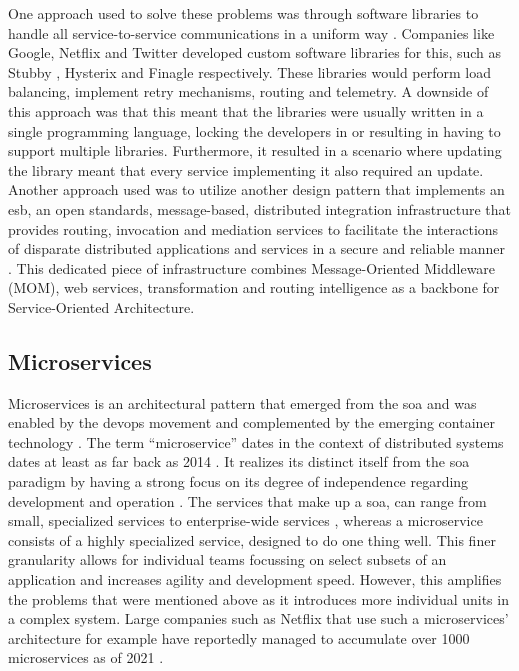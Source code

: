One approach used to solve these problems was through software libraries to handle all service-to-service communications in a uniform way \cite{service-mesh-history}. Companies like Google, Netflix and Twitter developed custom software libraries for this, such as Stubby \cite{stubby}, Hysterix \cite{hysterix} and Finagle \cite{finagle} respectively. These libraries would perform load balancing, implement retry mechanisms, routing and telemetry. A downside of this approach was that this meant that the libraries were usually written in a single programming language, locking the developers in or resulting in having to support multiple libraries. Furthermore, it resulted in a scenario where updating the library meant that every service implementing it also required an update.  Another approach used was to utilize another design pattern that implements an \gls{esb}, an open standards, message-based, distributed integration infrastructure that provides routing, invocation and mediation services to facilitate the interactions of disparate distributed applications and services in a secure and reliable manner \cite{menge2007enterprise}. This dedicated piece of infrastructure combines  Message-Oriented Middleware (MOM), web services, transformation and routing intelligence as a backbone for Service-Oriented Architecture.



\subsection{Microservices}
Microservices is an architectural pattern that emerged from the \gls{soa} and was enabled by the \gls{devops} movement \cite{microservices-trends} and complemented by the emerging \gls{container} technology \cite{amaral2015performance}.  The term “microservice” dates in the context of distributed systems dates at least as far back as 2014 \cite{fowler-microservice}. It realizes its distinct itself from the \gls{soa}  paradigm by having a strong focus on its degree of independence regarding development and operation \cite{rademacher2017differences}. The services that make up a \gls{soa}, can range from small, specialized services to enterprise-wide services \cite{ibm-soa-vs-microservices}, whereas a microservice consists of a highly specialized service, designed to do one thing well. This finer granularity allows for individual teams focussing on select subsets of an application and increases agility and development speed. However, this amplifies the problems that were mentioned above as it introduces more individual units in a complex system. Large companies such as Netflix that use such a microservices' architecture for example have reportedly managed to accumulate over 1000 microservices as of 2021 \cite{netflix-chaos, netflix-svc}.






